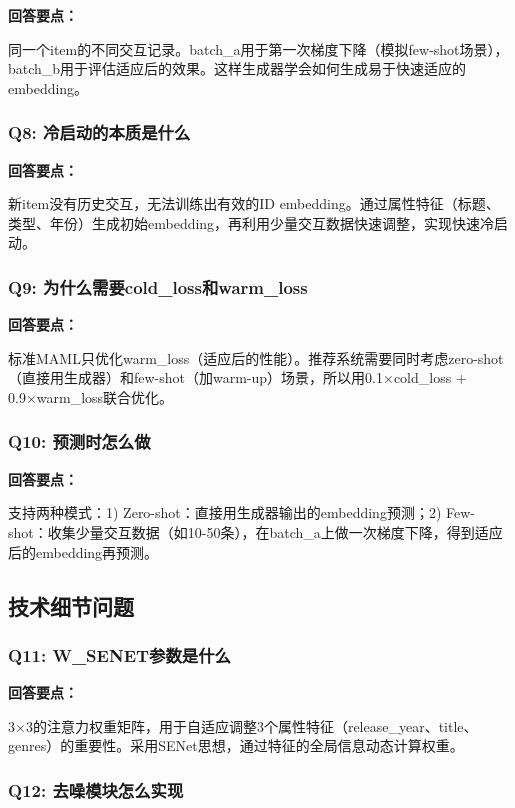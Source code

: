 \documentclass[12pt,a4paper]{article}
\begin{document}
\textbf{回答要点：}

同一个item的不同交互记录。batch\_a用于第一次梯度下降（模拟few-shot场景），batch\_b用于评估适应后的效果。这样生成器学会如何生成易于快速适应的embedding。

\subsubsection{Q8: 冷启动的本质是什么}

\textbf{回答要点：}

新item没有历史交互，无法训练出有效的ID embedding。通过属性特征（标题、类型、年份）生成初始embedding，再利用少量交互数据快速调整，实现快速冷启动。

\subsubsection{Q9: 为什么需要cold\_loss和warm\_loss}

\textbf{回答要点：}

标准MAML只优化warm\_loss（适应后的性能）。推荐系统需要同时考虑zero-shot（直接用生成器）和few-shot（加warm-up）场景，所以用0.1×cold\_loss + 0.9×warm\_loss联合优化。

\subsubsection{Q10: 预测时怎么做}

\textbf{回答要点：}

支持两种模式：1) Zero-shot：直接用生成器输出的embedding预测；2) Few-shot：收集少量交互数据（如10-50条），在batch\_a上做一次梯度下降，得到适应后的embedding再预测。

\subsection{技术细节问题}

\subsubsection{Q11: W\_SENET参数是什么}

\textbf{回答要点：}

3×3的注意力权重矩阵，用于自适应调整3个属性特征（release\_year、title、genres）的重要性。采用SENet思想，通过特征的全局信息动态计算权重。

\subsubsection{Q12: 去噪模块怎么实现}
\end{document}

